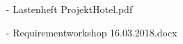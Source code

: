 \documentclass[../../Pflichtenheft.tex]{subfiles}
\begin{document}
	\begin{itemize}
		\item[-] Lastenheft ProjektHotel.pdf
		\item[-] Requirementworkshop 16.03.2018.docx
    \end{itemize}
\end{document}
